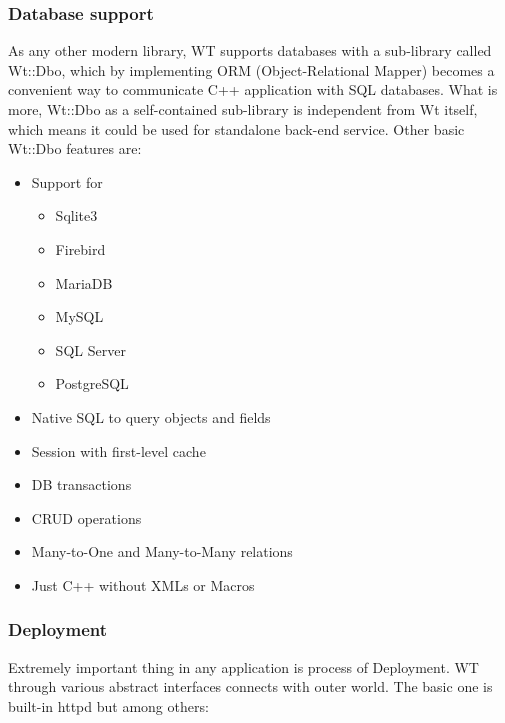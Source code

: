 \documentclass[a4paper,12pt]{article}
\newcommand\tab[1][1cm]{\hspace*{#1}}
\begin{document}
{{{}

\subsubsection*{Database support}
{
\tab As any other modern library, WT supports databases with a sub-library called Wt::Dbo, which by implementing ORM (Object-Relational Mapper) becomes a convenient way to communicate C++ application with SQL databases. What is more, Wt::Dbo as a self-contained sub-library is independent from Wt itself, which means it could be used for standalone back-end service. Other basic Wt::Dbo features are: 

\begin{itemize}
	\item Support for
	\begin{itemize}
     \item Sqlite3
     \item Firebird
     \item MariaDB
     \item MySQL
     \item SQL Server
     \item PostgreSQL
     \end{itemize}
	\item Native SQL to query objects and fields
	\item Session with first-level cache
	\item DB transactions
	\item CRUD operations
	\item Many-to-One and Many-to-Many relations
	\item Just C++ without XMLs or Macros

\end{itemize}
}

\subsubsection*{Deployment}
{
\tab Extremely important thing in any application is process of Deployment. WT through various abstract interfaces connects with outer world. The basic one is built-in httpd but among others:

}}}
\end{document}
